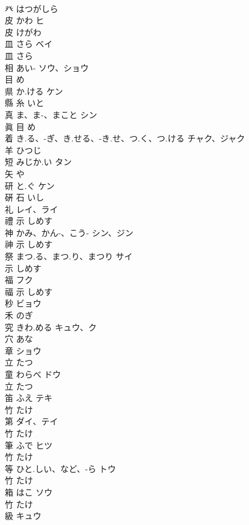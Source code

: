 \documentclass[8pt]{extreport}
\begin{document}
\begin{CJK}{UTF8}{min}
\\	癶		はつがしら		
\\	皮	かわ	ヒ	
\\	皮		けがわ		
\\	皿	さら	ベイ	
\\	皿		さら		
\\	相	あい-	ソウ、ショウ	
\\	目		め		
\\	県	か.ける	ケン	
\\	縣	糸		いと		
\\	真	ま、ま-、まこと	シン	
\\	眞	目		め		
\\	着	き.る、-ぎ、き.せる、-き.せ、つ.く、つ.ける	チャク、ジャク	
\\	羊		ひつじ		
\\	短	みじか.い	タン	
\\	矢		や		
\\	研	と.ぐ	ケン	
\\	硏	石		いし		
\\	礼		レイ、ライ	
\\	禮	示		しめす		
\\	神	かみ、かん-、こう-	シン、ジン	
\\	神	示		しめす		
\\	祭	まつ.る、まつ.り、まつり	サイ	
\\	示		しめす		
\\	福		フク	
\\	福	示		しめす		
\\	秒		ビョウ	
\\	禾		のぎ		
\\	究	きわ.める	キュウ、ク	
\\	穴		あな		
\\	章		ショウ	
\\	立		たつ		
\\	童	わらべ	ドウ	
\\	立		たつ		
\\	笛	ふえ	テキ	
\\	竹		たけ		
\\	第		ダイ、テイ	
\\	竹		たけ		
\\	筆	ふで	ヒツ	
\\	竹		たけ		
\\	等	ひと.しい、など、-ら	トウ	
\\	竹		たけ		
\\	箱	はこ	ソウ	
\\	竹		たけ		
\\	級		キュウ	

\end{CJK}
\end{document}
